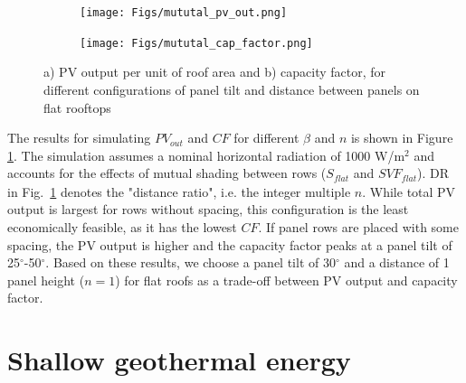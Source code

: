 \begin{figure}[tb]
	\centering
	\begin{subfigure}{.49\textwidth}
		\centering
		\texttt{[image: Figs/mututal\_pv\_out.png]}  
	\end{subfigure}
	\begin{subfigure}{.49\textwidth}
		\centering
		\texttt{[image: Figs/mututal\_cap\_factor.png]}  
	\end{subfigure}
	\caption{a) PV output per unit of roof area and b) capacity factor, for different configurations of panel tilt and distance between panels on flat rooftops}
	\label{fig:flat_panels}
\end{figure}

The results for simulating $\mathit{PV}_{\mathit{out}}$ and $\mathit{CF}$ for different $\beta$ and $n$ is shown in Figure \ref{fig:flat_panels}.
The simulation assumes a nominal horizontal radiation of 1000 W/m$^2$ and accounts for the effects of mutual shading between rows ($S_{\mathit{flat}}$ and $\mathit{SVF}_{\mathit{flat}}$). 
DR in Fig.~\ref{fig:flat_panels} denotes the "distance ratio", i.e. the integer multiple $n$. While total PV output is largest for rows without spacing, this configuration is the least economically feasible, as it has the lowest $\mathit{CF}$. If panel rows are placed with some spacing, the PV output is higher and the capacity factor peaks at a panel tilt of 25$^\circ$-50$^\circ$. 
Based on these results, we choose a panel tilt of 30$^\circ$ and a distance of 1 panel height ($n=1$) for flat roofs as a trade-off between PV output and capacity factor.

\section{Shallow geothermal energy}
\label{geo_method}

